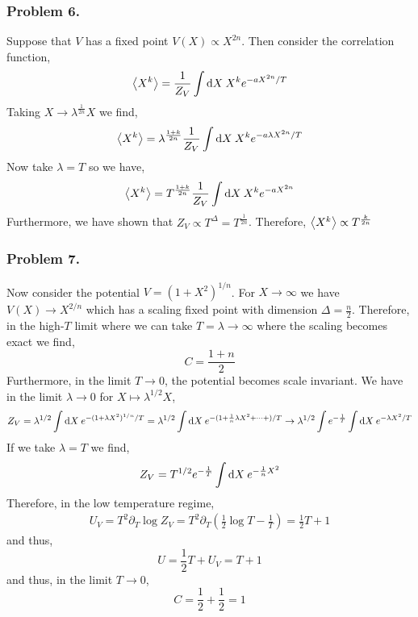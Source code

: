 \documentclass[12pt]{article}
\begin{document}
\subsubsection*{Problem 6.} 

Suppose that $V$ has a fixed point $V(X) \propto X^{2n}$. Then consider the correlation function,
\begin{align*}
\left< X^k \right> = \frac{1}{Z_V} \int \mathrm{d}X \: X^k e^{-a X^{2n} / T} 
\end{align*}
Taking $X \to \lambda^{\frac{1}{2n}} X$ we find,
\begin{align*}
\left< X^k \right> = \lambda^{\frac{1 + k}{2 n}} \frac{1}{Z_V} \int \mathrm{d}X \: X^k e^{-a \lambda X^{2n} / T} 
\end{align*}
Now take $\lambda = T$ so we have,
\begin{align*}
\left< X^k \right> = T^{\frac{1 + k}{2 n}} \frac{1}{Z_V} \int \mathrm{d}X \: X^k e^{-a X^{2n}} 
\end{align*}
Furthermore, we have shown that $Z_V \propto T^\Delta = T^{\frac{1}{2 n}}$.
Therefore,
$\left< X^k \right> \propto T^{\frac{k}{2n}}$ 

\subsubsection{Problem 7.} 

Now consider the potential $V = (1 + X^2)^{1/n}$. For $X \to \infty$ we have $V(X) \to X^{2/n}$ which has a scaling fixed point with dimension $\Delta = \frac{n}{2}$. Therefore, in the high-$T$ limit where we can take $T = \lambda \to \infty$ where the scaling becomes exact we find,
\[ C = \frac{1 + n}{2} \]
Furthermore, in the limit $T \to 0$, the potential becomes scale invariant. We have in the limit $\lambda \to 0$ for $X \mapsto \lambda^{1 / 2} X$,
\begin{align*}
Z_V = \lambda^{1/2} \int \mathrm{d}X \: e^{-(1 + \lambda X^2)^{1/n} / T} = \lambda^{1/2} \int \mathrm{d}X \: e^{- (1 + \frac{1}{n} \lambda X^{2} + \cdots + ) / T} \to \lambda^{1/2} \int e^{-\frac{1}{T}} \int \mathrm{d}X \: e^{-\lambda X^{2}/T}
\end{align*}
If we take $\lambda = T$ we find,
\begin{align*}
Z_V = T^{1/2} e^{-\frac{1}{T}} \int \mathrm{d}X \: e^{- \frac{1}{n} X^{2}}
\end{align*}
Therefore, in the low temperature regime, 
\begin{align*}
U_V = T^2 \partial_T \log{Z_V} = T^2 \partial_T \left( \frac{1}{2} \log{T} - \frac{1}{T} \right) = \frac{1}{2} T + 1
\end{align*}
and thus,
\[ U = \frac{1}{2} T + U_V = T + 1 \]
and thus, in the limit $T \to 0$,
\[ C = \frac{1}{2} + \frac{1}{2} = 1 \]
\end{document}
